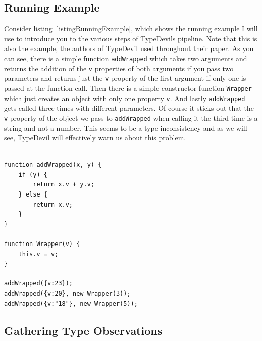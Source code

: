 \documentclass[runningheads,a4paper]{llncs}
\begin{document}
\subsection{Running Example}
Consider listing \ref{listingRunningExample}, which shows the running example I will use to introduce you to the various steps of TypeDevils pipeline.
Note that this is also the example, the authors of TypeDevil used throughout their paper.
As you can see, there is a simple function \lstinline[columns=fixed]{addWrapped} which takes two arguments and returns the addition of the \lstinline[columns=fixed]{v} properties of both arguments if you pass two parameters and returns just the \lstinline[columns=fixed]{v} property of the first argument if only one is passed at the function call.
Then there is a simple constructor function \lstinline[columns=fixed]{Wrapper} which just creates an object with only one property \lstinline[columns=fixed]{v}.
And lastly \lstinline[columns=fixed]{addWrapped} gets called three times with different parameters.
Of course it sticks out that the \lstinline[columns=fixed]{v} property of the object we pass to \lstinline[columns=fixed]{addWrapped} when calling it the third time is a string and not a number.
This seems to be a type inconsistency and as we will see, TypeDevil will effectively warn us about this problem.
\\ \\
\lstset{language=javascript}
\begin{minipage}{\linewidth}
\begin{lstlisting}[frame=single, caption=Running Example, label=listingRunningExample]
function addWrapped(x, y) {
    if (y) {
        return x.v + y.v;
    } else {
        return x.v;
    }
}

function Wrapper(v) {
    this.v = v;
}

addWrapped({v:23});
addWrapped({v:20}, new Wrapper(3));
addWrapped({v:"18"}, new Wrapper(5));
\end{lstlisting}
\end{minipage}


\subsection{Gathering Type Observations}
\end{document}
